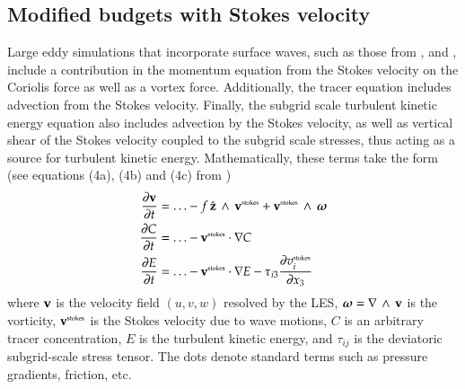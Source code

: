 \subsection{Modified budgets with Stokes velocity}
\label{subsection:stokes-into-pe-kpp}

Large eddy simulations that incorporate surface waves, such as those
from \cite{McWilliamsSullivanMoeng1997}, \cite{McWilliamsSullivan2001}
and \cite{SullivanMcWilliams07}, include a contribution in the
momentum equation from the Stokes velocity on the Coriolis force as
well as a vortex force.  Additionally, the tracer equation includes
advection from the Stokes velocity.  Finally, the subgrid scale
turbulent kinetic energy equation also includes advection by the
Stokes velocity, as well as vertical shear of the Stokes velocity
coupled to the subgrid scale stresses, thus acting as a source for
turbulent kinetic energy. Mathematically, these terms take the form
(see equations (4a), (4b) and (4c) from \cite{SullivanMcWilliams2010})
\begin{align}
\frac{\partial {\bf v}}{\partial t} &= \ldots -f \, \hat{\bf z} \, \wedge \, {\bf v}^{\mbox{\tiny stokes}}  
 + {\bf v}^{\mbox{\tiny stokes}}  \, \wedge \, \mbox{\boldmath $\omega$}
\\
\frac{\partial C}{\partial t} &= \ldots -{\bf v}^{\mbox{\tiny stokes}} \cdot \nabla C
\\
\frac{\partial E}{\partial t} &= \ldots -{\bf v}^{\mbox{\tiny stokes}} \cdot \nabla E
 - \tau_{i3} \frac{\partial v^{\mbox{\tiny stokes}}_{i}}{\partial x_{3}}
\end{align}
where ${\bf v}$ is the velocity field $(u,v,w)$ resolved by the LES,
$\mbox{\boldmath $\omega$} = \nabla \, \wedge \, {\bf v}$ is the vorticity, ${\bf
  v}^{\mbox{\tiny stokes}}$ is the Stokes velocity due to wave
motions, $C$ is an arbitrary tracer concentration, $E$ is the
turbulent kinetic energy, and $\tau_{ij}$ is the deviatoric
subgrid-scale stress tensor. The dots denote standard terms such as
pressure gradients, friction, etc.


